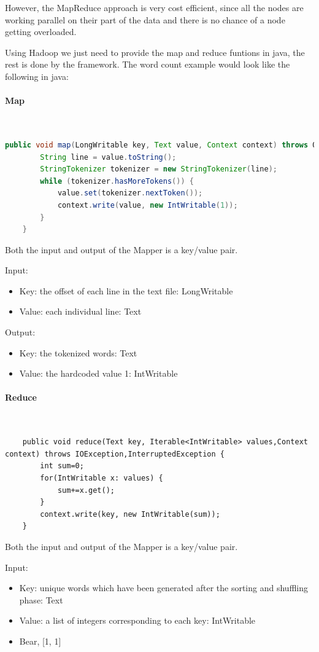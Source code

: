However, the MapReduce approach is very cost efficient, since all the nodes are working parallel on their part of the data and there is no chance of a node getting overloaded.

Using Hadoop we just need to provide the map and reduce funtions in java, the rest is done by the framework.  The word count example would look like the following in java:
\paragraph{Map}\mbox{}\\
\begin{lstlisting}[language=Java]
	public void map(LongWritable key, Text value, Context context) throws OException,InterruptedException {
		String line = value.toString();
		StringTokenizer tokenizer = new StringTokenizer(line);
		while (tokenizer.hasMoreTokens()) {
			value.set(tokenizer.nextToken());
			context.write(value, new IntWritable(1));
		}
	}
\end{lstlisting}
Both the input and output of the Mapper is a key/value pair. 

Input:
\begin{itemize}
	\item Key: the offset of each line in the text file: LongWritable
	\item Value: each individual line: Text
\end{itemize}

Output:
\begin{itemize}
	\item Key: the tokenized words: Text
	\item Value: the hardcoded value 1: IntWritable
\end{itemize}

\paragraph{Reduce}\mbox{}\\
\begin{lstlisting}
	public void reduce(Text key, Iterable<IntWritable> values,Context context) throws IOException,InterruptedException {
		int sum=0;
		for(IntWritable x: values) {
			sum+=x.get();
		}
		context.write(key, new IntWritable(sum));
	}
\end{lstlisting}
Both the input and output of the Mapper is a key/value pair. 

Input:
\begin{itemize}
	\item Key: unique words which have been generated after the sorting and shuffling phase: Text
	\item Value: a list of integers corresponding to each key: IntWritable 
	\item \eg Bear, [1, 1]
\end{itemize}


